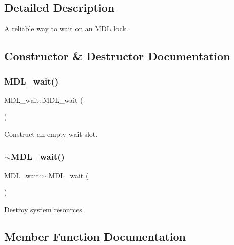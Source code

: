 \subsection{Detailed Description}
A reliable way to wait on an M\+DL lock. 

\subsection{Constructor \& Destructor Documentation}
\mbox{\label{classMDL__wait_ac850dcbdaddab5440bdf2033256559a2}} 
\subsubsection{\texorpdfstring{M\+D\+L\+\_\+wait()}{MDL\_wait()}}
{\footnotesize\ttfamily M\+D\+L\+\_\+wait\+::\+M\+D\+L\+\_\+wait (\begin{DoxyParamCaption}{ }\end{DoxyParamCaption})}

Construct an empty wait slot. \mbox{\label{classMDL__wait_ad75646f009b4c73a4616db585623b0f7}} 
\subsubsection{\texorpdfstring{$\sim$\+M\+D\+L\+\_\+wait()}{~MDL\_wait()}}
{\footnotesize\ttfamily M\+D\+L\+\_\+wait\+::$\sim$\+M\+D\+L\+\_\+wait (\begin{DoxyParamCaption}{ }\end{DoxyParamCaption})}

Destroy system resources. 

\subsection{Member Function Documentation}
\mbox{\label{classMDL__wait_af26291f41cc59cb379fb593f8af4bc2c}} 

